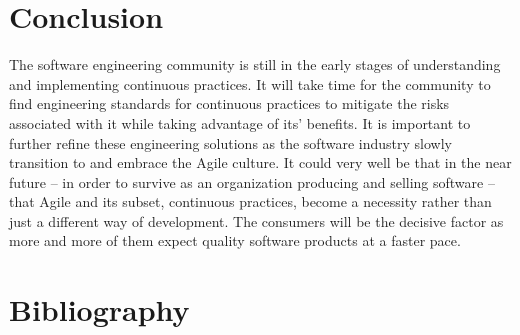 \documentclass[12pt,a4paper]{article}
\begin{document}
\section{Conclusion}
The software engineering community is still in the early stages of understanding and implementing continuous practices. It will take time for the community to find engineering standards for continuous practices to mitigate the risks associated with it while taking advantage of its' benefits. It is important to further refine these engineering solutions as the software industry slowly transition to and embrace the Agile culture. It could very well be that in the near future -- in order to survive as an organization producing and selling software -- that Agile and its subset, continuous practices, become a necessity rather than just a different way of development. The consumers will be the decisive factor as more and more of them expect quality software products at a faster pace.

\newpage
\section{Bibliography}
\nocite{*}


\end{document}
